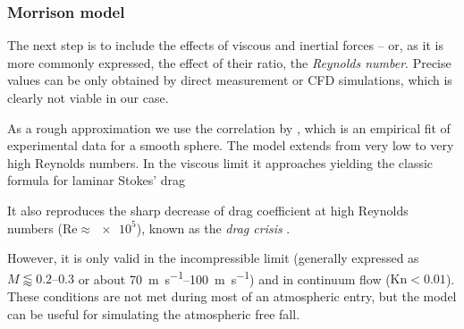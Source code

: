         \subsubsection{Morrison model} \label{fdmM}
            The next step is to include the effects of viscous and inertial forces -- or,
            as it is more commonly expressed, the effect of their ratio, the \emph{Reynolds number}.
            Precise values can be only obtained by direct measurement or CFD simulations,
            which is clearly not viable in our case.

            As a rough approximation we use the correlation by \citet{morrison2016},
            which is an empirical fit of experimental data for a smooth sphere.
            The model extends from very low to very high Reynolds numbers.
            In the viscous limit it approaches
            yielding the classic formula for laminar Stokes' drag

            It also reproduces the sharp decrease of drag coefficient at high Reynolds
            numbers ($\mathrm{Re} \approx \num{e5}$), known as the \emph{drag crisis} \cite{???}.


            However, it is only valid in the incompressible limit
            (generally expressed as $M \lessapprox \numrange{0.2}{0.3}$ or
            about \SIrange{70}{100}{\metre\per\second}) and in continuum flow ($\mathrm{Kn} < \num{0.01}$).
            These conditions are not met during most of an atmospheric entry,
            but the model can be useful for simulating the atmospheric free fall.

